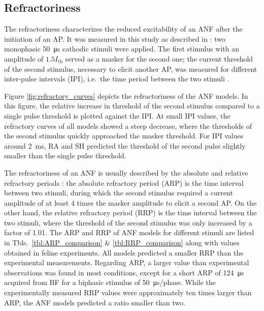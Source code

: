 \documentclass[utf8]{frontiersSCNS} %
\newcommand{\T}[1]{\text{#1}}
\begin{document}
\subsection{Refractoriness}
\label{subsec:refractory_proberties}
The refractoriness characterizes the reduced excitability of an ANF after the initiation of an AP. It was measured in this study as described in \cite{Frijns1994}: two  monophasic \SI{50}{\micro\second} cathodic stimuli were applied.
The first stimulus with an amplitude of $1.5 I_{\T{th}}$ served as a masker for the second one; the current threshold of the second stimulus, necessary to elicit another AP, was measured for different inter-pulse intervals (IPI), i.e.\ the time period between the two stimuli \citep{Wesselink1999}.

Figure \ref{fig:refractory_curves} depicts the refractoriness of the ANF models. In this figure, the relative increase in threshold of the second stimulus compared to a single pulse threshold is plotted against the IPI.
At small IPI values, the refractory curves of all models showed a steep decrease, where the thresholds of the second stimulus quickly approached the masker threshold. For IPI values around \SI{2}{\milli\second}, RA and SH predicted the threshold of the second pulse slightly smaller than the single pulse threshold.

The refractoriness of an ANF is usually described by the absolute and relative refractory periods \citep{Wesselink1999}: the absolute refractory period (ARP) is the time interval between two stimuli, during which the second stimulus required a current amplitude of at least 4 times the masker amplitude to elicit a second AP. On the other hand, the relative refractory period (RRP) is the time interval between the two stimuli, where the threshold of the second stimulus was only increased by a factor of 1.01.
The ARP and RRP of ANF models for different stimuli are listed in Tbls.\ \ref{tbl:ARP_comparison} \& \ref{tbl:RRP_comparison} along with values obtained in feline experiments. All models predicted a smaller RRP than the experimental measurements. Regarding ARP, a larger value than experimental observations was found in most conditions, except for a short ARP of \SI{124}{\micro\second} acquired from BF for a biphasic stimulus of \SI{50}{\micro\second}/phase. While the experimentally measured RRP values were approximately ten times larger than ARP, the ANF models predicted a ratio smaller than two.

\end{document}

